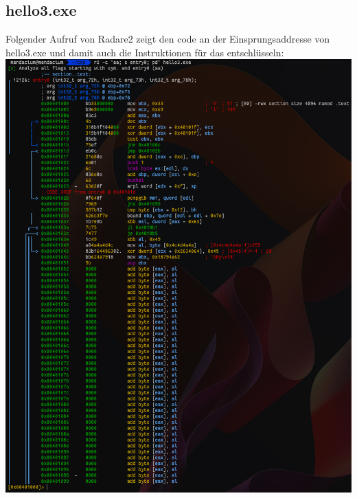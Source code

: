 \documentclass{article}
\begin{document}
	\subsection{hello3.exe}
	Folgender Aufruf von Radare2 zeigt den code an der Einsprungsaddresse von hello3.exe und damit auch die Instruktionen für das entschlüsseln:\\
	\includegraphics[width=0.5\linewidth]{pictures/hello3-radare2}\\
	
	\pagebreak
	
\end{document}
